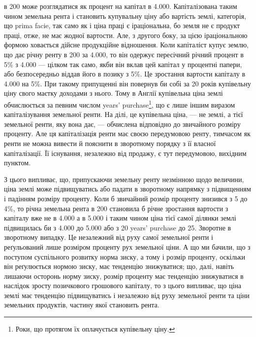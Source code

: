 \parcont{}  %
в 200 може розглядатися як процент на капітал в \num{4.000}. Капіталізована
таким чином земельна рента і становить купувальну ціну або вартість землі,
категорія, що prima facie, так само як і ціна праці є іраціональна, бо земля не є продукт
праці, отже, не має жодної вартости. Але, з другого боку, за цією іраціональною
формою ховається дійсне продукційне відношення. Коли капіталіст купує
землю, що дає річну ренту в 200 за \num{4.000}, то він одержує пересічний річний
процент в 5\% з \num{4.000} — цілком так само, якби він вклав цей капітал у
процентні папери, або безпосередньо віддав його в позику з 5\%. Це зростання вартости
капіталу в \num{4.000} на 5\%. При такому припущенні він повернув би собі
за 20 років купівельну ціну свого маєтку доходами з нього. Тому в Англії купівельна
ціна землі обчислюється за певним числом years’ purchase\footnote*{
Роки, що протягом їх оплачується купівельну ціну. 
}, що є лише іншим
виразом капіталізування земельної ренти. На ділі, це купівельна ціна, — не
землі, а тієї земельної ренти, яку вона дає, — обчислена відповідно до звичайного
розміру проценту. Але ця капіталізація ренти має своєю передумовою
ренту, тимчасом як ренти не можна вивести й пояснити в зворотному порядку
з її власної капіталізації. Її існування, незалежно від продажу, є тут
передумовою, вихідним пунктом.

З цього випливає, що, припускаючи земельну ренту незмінною щодо величини,
ціна землі може підвищуватись або падати в зворотному напрямку з
підвищенням і падінням розміру проценту. Коли б звичайний розмір проценту
знизився з 5 до 4\%, то річна земельна рента в 200 становила б річне
зростання вартости з капіталу вже не в \num{4.000} а в \num{5.000} і таким чином
ціна тієї самої ділянки землі підвищилась би з \num{4.000} до \num{5.000} або з 20 years’
purchase до 25. Зворотне в зворотному випадку. Це незалежний від руху самої
земельної ренти і реґульований лише розміром проценту рух земельної ціни.
А що ми бачили, що з поступом суспільного розвитку норма зиску, а тому і
розмір проценту, оскільки він реґулюється нормою зиску, має тенденцію
знижуватися; що, далі, навіть лишаючи осторонь норму зиску, розмір проценту
має тенденцію знижуватися в наслідок зросту позичкового грошового капіталу,
то з цього випливає, що ціна землі має тенденцію підвищуватись і незалежно
від руху земельної ренти та ціни земельних продуктів, частину якої становить
рента.

